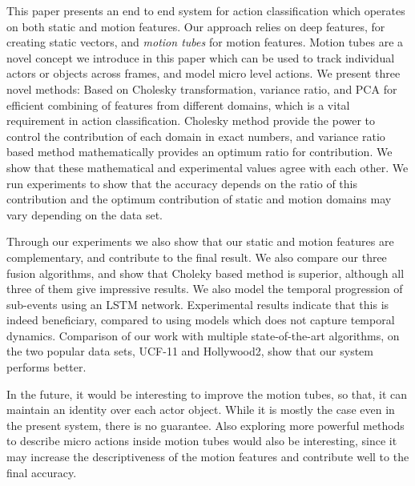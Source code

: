 This paper presents an end to end system for action classification which operates
on both static and motion features. Our approach relies on deep features,
for creating static vectors, and \textit{motion tubes} for motion features.
Motion tubes are a novel concept we introduce in this paper which can be
used to track individual actors or objects across frames, and model micro level actions.
We present three novel methods: Based on Cholesky transformation, variance ratio, and PCA for efficient combining of features
from different domains, which is a vital requirement in action classification.
Cholesky method provide the power to control the contribution of each domain in exact numbers, and
variance ratio based method mathematically provides an optimum ratio for contribution. We show that these mathematical
and experimental values agree with each other. We run experiments to show that the accuracy depends on the ratio of this contribution and the optimum contribution of
static and motion domains may vary depending on the data set.

Through our experiments we also show that our static and motion features are complementary,
and contribute to the final result. We also compare our three fusion algorithms, and
show that Choleky based method is superior, although all three of them give impressive results. We also model the temporal progression of sub-events using an LSTM network. Experimental
results indicate that this is indeed beneficiary, compared to using models which does not capture temporal dynamics. Comparison of our work with multiple state-of-the-art algorithms, on the two popular data sets, UCF-11 and Hollywood2, show that our system performs better.


In the future, it would be interesting to improve the motion tubes, so that, it can maintain an identity over each actor object.
While it is mostly the case even in the present system, there is no guarantee. 
Also exploring more powerful methods to describe micro actions inside motion tubes would also be interesting, since it may increase the descriptiveness of the motion features and
contribute well to the final accuracy.
